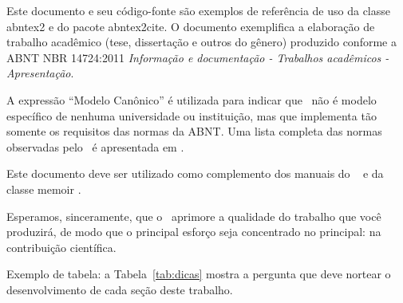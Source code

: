 Este documento e seu código-fonte são exemplos de referência de uso da classe \textsf{abntex2} e do pacote \textsf{abntex2cite}. O documento exemplifica a elaboração de trabalho acadêmico (tese, dissertação e outros do gênero) produzido conforme a ABNT NBR 14724:2011 \emph{Informação e documentação - Trabalhos acadêmicos - Apresentação}.

A expressão ``Modelo Canônico'' é utilizada para indicar que \abnTeX\ não é modelo específico de nenhuma universidade ou instituição, mas que implementa tão somente os requisitos das normas da ABNT. Uma lista completa das normas observadas pelo \abnTeX\ é apresentada em .


Este documento deve ser utilizado como complemento dos manuais do \abnTeX\ \cite{abntex2classe,abntex2cite,abntex2cite-alf} e da classe \textsf{memoir} \cite{memoir}.

Esperamos, sinceramente, que o \abnTeX\ aprimore a qualidade do trabalho que você produzirá, de modo que o principal esforço seja concentrado no principal: na contribuição científica.

Exemplo de tabela: a Tabela~\ref{tab:dicas} mostra a pergunta que deve nortear o desenvolvimento de cada seção deste trabalho.

